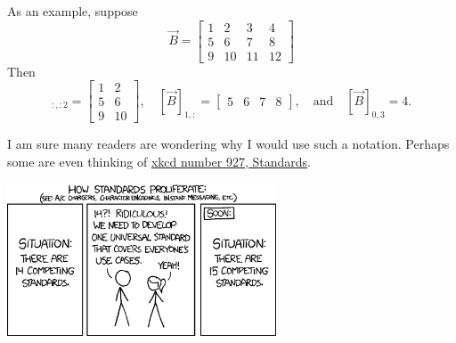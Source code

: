 As an example, suppose
\begin{equation*}
    \vec{B} = 
    \begin{bmatrix}
        1 & 2 & 3 & 4 \\
        5 & 6 & 7 & 8 \\
        9 & 10 & 11 & 12
    \end{bmatrix}
\end{equation*}
Then
\begin{equation*}
    [\vec{B}]_{:,:2}
    = 
    \begin{bmatrix}
        1 & 2 \\
        5 & 6 \\
        9 & 10
    \end{bmatrix}
    ,\quad
    [\vec{B}]_{1,:} 
    = 
    \begin{bmatrix}5&6&7&8\end{bmatrix},
    \quad\text{and}\quad
    [\vec{B}]_{0,3} = 4.
\end{equation*}

I am sure many readers are wondering why I would use such a notation. 
Perhaps some are even thinking of \href{https://xkcd.com/927/}{xkcd number 927, Standards}.

\begin{center}
    \includegraphics[width=8cm]{imgs/standards.png}
\end{center}

